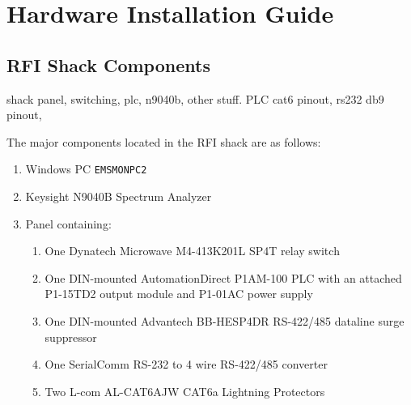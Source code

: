\documentclass[titlepage]{article}
\begin{document}
\section{Hardware Installation Guide}\label{sec:hig}
\subsection{RFI Shack Components}
shack panel, switching, plc, n9040b, other stuff. PLC cat6 pinout, rs232 db9 pinout,

The major components located in the RFI shack are as follows:
\begin{enumerate}
  \item Windows PC \verb|EMSMONPC2|
  \item Keysight N9040B Spectrum Analyzer
  \item Panel containing:
  \begin{enumerate}
    \item One Dynatech Microwave M4-413K201L SP4T relay switch
    \item One DIN-mounted AutomationDirect P1AM-100 PLC with an attached P1-15TD2 output module and P1-01AC power supply
    \item One DIN-mounted Advantech BB-HESP4DR RS-422/485 dataline surge suppressor
    \item One SerialComm RS-232 to 4 wire RS-422/485 converter
    \item Two L-com AL-CAT6AJW CAT6a Lightning Protectors
  \end{enumerate}
\end{enumerate}
\end{document}
